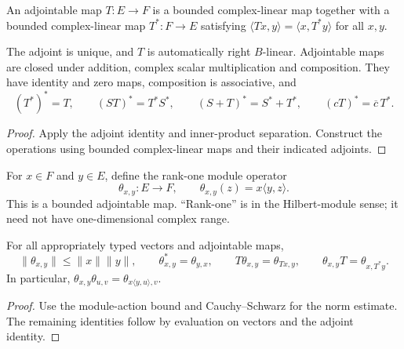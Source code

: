 \begin{definition}\label{def:adjointable-module-map}
\leanok
An adjointable map $T:E\to F$ is a bounded complex-linear map together with
a bounded complex-linear map $T^*:F\to E$ satisfying
$\langle Tx,y\rangle=\langle x,T^*y\rangle$ for all $x,y$.
\end{definition}

\begin{proposition}\label{prop:adjointable-module-map-laws}
\leanok
The adjoint is unique, and $T$ is automatically right $B$-linear.
Adjointable maps are closed under addition, complex scalar multiplication
and composition. They have identity and zero maps, composition is associative,
and
\[
 (T^*)^*=T,\qquad (ST)^*=T^*S^*,\qquad
 (S+T)^*=S^*+T^*,\qquad (cT)^*=\overline c\,T^*.
\]
\end{proposition}
\begin{proof}
\leanok
Apply the adjoint identity and inner-product separation. Construct the
operations using bounded complex-linear maps and their indicated adjoints.
\end{proof}

\begin{definition}\label{def:module-rank-one}
\leanok
For $x\in F$ and $y\in E$, define the rank-one module operator
\[
 \theta_{x,y}:E\longrightarrow F,\qquad
 \theta_{x,y}(z)=x\langle y,z\rangle.
\]
This is a bounded adjointable map. ``Rank-one'' is in the Hilbert-module sense;
it need not have one-dimensional complex range.
\end{definition}

\begin{proposition}\label{prop:module-rank-one-laws}
\leanok
For all appropriately typed vectors and adjointable maps,
\[
 \|\theta_{x,y}\|\leq\|x\|\|y\|,\qquad
 \theta_{x,y}^*=\theta_{y,x},\qquad
 T\theta_{x,y}=\theta_{Tx,y},\qquad
 \theta_{x,y}T=\theta_{x,T^*y}.
\]
In particular,
$\theta_{x,y}\theta_{u,v}=\theta_{x\langle y,u\rangle,v}$.
\end{proposition}
\begin{proof}
\leanok
Use the module-action bound and Cauchy--Schwarz for the norm estimate.
The remaining identities follow by evaluation on vectors and the adjoint identity.
\end{proof}

